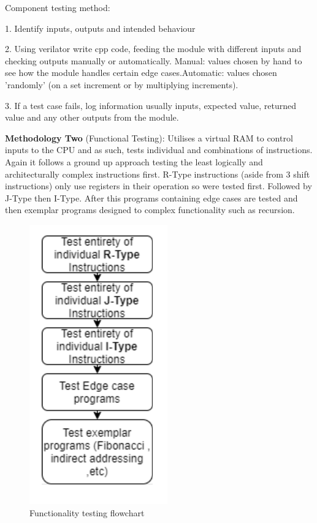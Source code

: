 \documentclass[10pt]{datasheet}
\begin{document}
\smallbreak

Component testing method:

1. Identify inputs, outputs and intended behaviour

2. Using verilator write cpp code, feeding the module with different inputs and checking outputs manually or automatically.
Manual: values chosen by hand to see how the module handles certain edge cases.Automatic: values chosen 'randomly' (on a set increment or by multiplying increments).

\vfill\break

3. If a test case fails, log information usually inputs, expected value, returned value and any other outputs from the module.

 



\textbf{Methodology Two} (Functional Testing): Utilises a virtual RAM to control inputs to the CPU and as such, tests individual and combinations of instructions. Again it follows a ground up approach testing the least logically and architecturally complex instructions first. R-Type instructions (aside from 3 shift instructions) only use registers in their operation so were tested first. Followed by J-Type then I-Type. After this programs containing edge cases are tested and then exemplar programs designed to complex functionality such as recursion.
\begin{figure}[h]
    \centering
    \includegraphics[scale=0.7]{Assets/functflow.PNG}
    \captionsetup{justification=centering}
    \caption{Functionality testing flowchart}
\end{figure}
\end{document}
